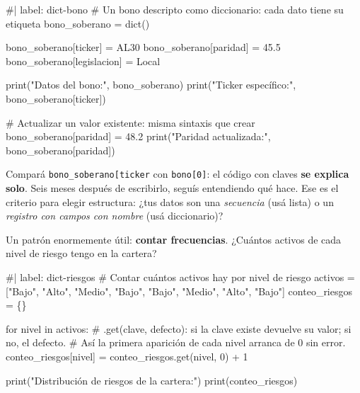 \documentclass[
  spanish,
  letterpaper,
  DIV=11,
  numbers=noendperiod]{scrreprt}
\newenvironment{Shaded}{\begin{snugshade}}{\end{snugshade}}
\newcommand{\NormalTok}[1]{\textcolor[rgb]{0.00,0.23,0.31}{#1}}
\begin{document}
\begin{Shaded}
\begin{Highlighting}[]
\NormalTok{\#| label: dict{-}bono}
\NormalTok{\# Un bono descripto como diccionario: cada dato tiene su etiqueta}
\NormalTok{bono\_soberano = dict()}

\NormalTok{bono\_soberano[\textquotesingle{}ticker\textquotesingle{}] = \textquotesingle{}AL30\textquotesingle{}}
\NormalTok{bono\_soberano[\textquotesingle{}paridad\textquotesingle{}] = 45.5}
\NormalTok{bono\_soberano[\textquotesingle{}legislacion\textquotesingle{}] = \textquotesingle{}Local\textquotesingle{}}

\NormalTok{print("Datos del bono:", bono\_soberano)}
\NormalTok{print("Ticker específico:", bono\_soberano[\textquotesingle{}ticker\textquotesingle{}])}

\NormalTok{\# Actualizar un valor existente: misma sintaxis que crear}
\NormalTok{bono\_soberano[\textquotesingle{}paridad\textquotesingle{}] = 48.2}
\NormalTok{print("Paridad actualizada:", bono\_soberano[\textquotesingle{}paridad\textquotesingle{}])}
\end{Highlighting}
\end{Shaded}

Compará
\texttt{bono\_soberano{[}\textquotesingle{}ticker\textquotesingle{}{]}}
con \texttt{bono{[}0{]}}: el código con claves \textbf{se explica solo}.
Seis meses después de escribirlo, seguís entendiendo qué hace. Ese es el
criterio para elegir estructura: ¿tus datos son una \emph{secuencia}
(usá lista) o un \emph{registro con campos con nombre} (usá
diccionario)?

Un patrón enormemente útil: \textbf{contar frecuencias}. ¿Cuántos
activos de cada nivel de riesgo tengo en la cartera?

\begin{Shaded}
\begin{Highlighting}[]
\NormalTok{\#| label: dict{-}riesgos}
\NormalTok{\# Contar cuántos activos hay por nivel de riesgo}
\NormalTok{activos = ["Bajo", "Alto", "Medio", "Bajo", "Bajo", "Medio", "Alto", "Bajo"]}
\NormalTok{conteo\_riesgos = \{\}}

\NormalTok{for nivel in activos:}
\NormalTok{    \# .get(clave, defecto): si la clave existe devuelve su valor; si no, el defecto.}
\NormalTok{    \# Así la primera aparición de cada nivel arranca de 0 sin error.}
\NormalTok{    conteo\_riesgos[nivel] = conteo\_riesgos.get(nivel, 0) + 1}

\NormalTok{print("Distribución de riesgos de la cartera:")}
\NormalTok{print(conteo\_riesgos)}
\end{Highlighting}
\end{Shaded}
\end{document}
